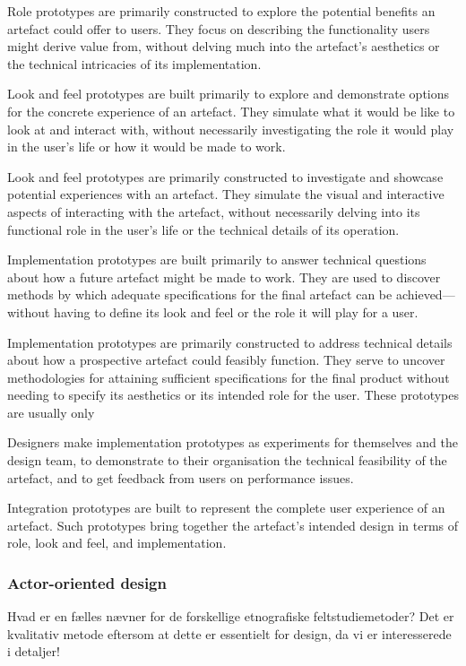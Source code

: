 Role prototypes are primarily constructed to explore the potential benefits an artefact could offer to users. They focus on describing the functionality users might derive value from, without delving much into the artefact's aesthetics or the technical intricacies of its implementation.

Look and feel prototypes are built primarily to explore and demonstrate options for the concrete experience of an artefact. They simulate what it would be like to look at and interact with, without necessarily investigating the role it would play in the user’s life or how it would be made to work.

Look and feel prototypes are primarily constructed to investigate and showcase potential experiences with an artefact. They simulate the visual and interactive aspects of interacting with the artefact, without necessarily delving into its functional role in the user's life or the technical details of its operation.

Implementation prototypes are built primarily to answer technical questions about how a future artefact might be made to work. They are used to discover methods by which adequate specifications for the final artefact can be achieved—without having
to define its look and feel or the role it will play for a user.

Implementation prototypes are primarily constructed to address technical details about how a prospective artefact could feasibly function. They serve to uncover methodologies for attaining sufficient specifications for the final product without needing to specify its aesthetics or its intended role for the user. These prototypes are usually only 

Designers make implementation prototypes as experiments for themselves and the design team, to demonstrate to their organisation the technical feasibility of the artefact, and to get feedback from users on performance issues.

Integration prototypes are built to represent the
complete user experience of an artefact. Such prototypes
bring together the artefact’s intended design
in terms of role, look and feel, and implementation.



\subsubsection{Actor-oriented design}
Hvad er en fælles nævner for de forskellige etnografiske feltstudiemetoder?
Det er kvalitativ metode eftersom at dette er essentielt for design, da vi er interesserede i detaljer!

